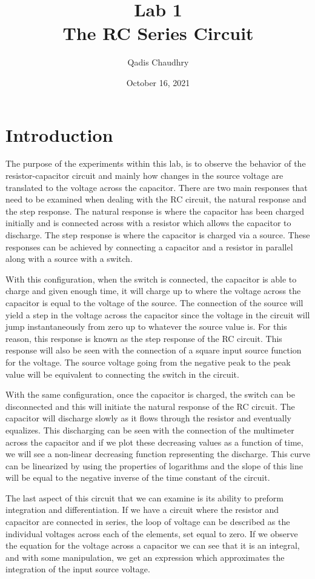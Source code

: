 \documentclass[12pt]{article}
\title{Lab 1 \\ The RC Series Circuit}
\author{Qadis Chaudhry}
\date{October 16, 2021}
\begin{document}
\maketitle
    \section*{Introduction}
    \par The purpose of the experiments within this lab, is to observe the behavior of the resistor-capacitor circuit and mainly how changes in the source voltage are translated to the voltage across the capacitor. There are two main responses that need to be examined when dealing with the RC circuit, the natural response and the step response. The natural response is where the capacitor has been charged initially and is connected across with a resistor which allows the capacitor to discharge. The step response is where the capacitor is charged via a source. These responses can be achieved by connecting a capacitor and a resistor in parallel along with a source with a switch.
    \par With this configuration, when the switch is connected, the capacitor is able to charge and given enough time, it will charge up to where the voltage across the capacitor is equal to the voltage of the source. The connection of the source will yield a step in the voltage across the capacitor since the voltage in the circuit will jump instantaneously from zero up to whatever the source value is. For this reason, this response is known as the step response of the RC circuit. This response will also be seen with the connection of a square input source function for the voltage. The source voltage going from the negative peak to the peak value will be equivalent to connecting the switch in the circuit.
    \par With the same configuration, once the capacitor is charged, the switch can be disconnected and this will initiate the natural response of the RC circuit. The capacitor will discharge slowly as it flows through the resistor and eventually equalizes. This discharging can be seen with the connection of the multimeter across the capacitor and if we plot these decreasing values as a function of time, we will see a non-linear decreasing function representing the discharge. This curve can be linearized by using the properties of logarithms and the slope of this line will be equal to the negative inverse of the time constant of the circuit.
    \par The last aspect of this circuit that we can examine is its ability to preform integration and differentiation. If we have a circuit where the resistor and capacitor are connected in series, the loop of voltage can be described as the individual voltages across each of the elements, set equal to zero. If we observe the equation for the voltage across a capacitor we can see that it is an integral, and with some manipulation, we get an expression which approximates the integration of the input source voltage.
    \newpage
\end{document}

